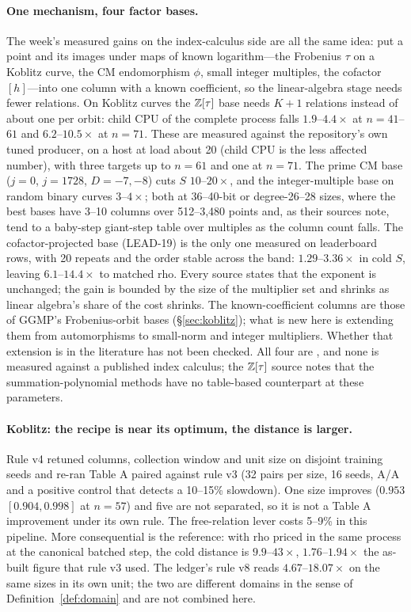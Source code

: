 \paragraph{One mechanism, four factor bases.} The week's measured gains on
the index-calculus side are all the same idea: put a point and its images
under maps of known logarithm---the Frobenius $\tau$ on a Koblitz curve, the
CM endomorphism $\phi$, small integer multiples, the cofactor $[h]$---into
one column with a known coefficient, so the linear-algebra stage needs fewer
relations. On Koblitz curves the $\mathbb{Z}[\tau]$ base needs $K+1$ relations
instead of about one per orbit: child CPU of the complete process falls
$1.9$--$4.4\times$ at $n=41$--$61$ and $6.2$--$10.5\times$ at $n=71$. These
are measured against the repository's own tuned producer, on a host at load
about 20 (child CPU is the less affected number), with three targets up to
$n=61$ and one at $n=71$. The prime CM base ($j=0$, $j=1728$, $D=-7,-8$) cuts
$S$ $10$--$20\times$, and the integer-multiple base on random binary curves
$3$--$4\times$; both at 36--40-bit or degree-26--28 sizes, where the best
bases have 3--10 columns over 512--3{,}480 points and, as their sources note,
tend to a baby-step giant-step table over multiples as the column count
falls. The
cofactor-projected base (LEAD-19) is the only one measured on leaderboard
rows, with 20 repeats and the order stable across the band: $1.29$--$3.36\times$
in cold $S$, leaving $6.1$--$14.4\times$ to matched rho. Every source states
that the exponent is unchanged; the gain is bounded by the size of the
multiplier set and shrinks as linear algebra's share of the cost shrinks.
The known-coefficient columns are those of GGMP's Frobenius-orbit bases
\cite{ggmp2020} (\S\ref{sec:koblitz}); what is new here is extending them
from automorphisms to small-norm and integer multipliers. Whether that
extension is in the literature has not been checked. All four are
, and none is measured against a published index
calculus; the $\mathbb{Z}[\tau]$ source notes that the summation-polynomial methods
have no table-based counterpart at these parameters.

\paragraph{Koblitz: the recipe is near its optimum, the distance is
larger.} Rule v4 retuned columns, collection window and unit size on
disjoint training seeds and re-ran Table A paired against rule v3 (32 pairs
per size, 16 seeds, A/A and a positive control that detects a 10--15\%
slowdown). One size improves ($0.953$ $[0.904,0.998]$ at $n=57$) and five are
not separated, so it is not a Table A improvement under its own rule. The
free-relation lever costs 5--9\% in this pipeline. More consequential is the
reference: with rho priced in the same process at the canonical batched step,
the cold distance is $9.9$--$43\times$, $1.76$--$1.94\times$ the as-built
figure that rule v3 used. The ledger's rule v8 reads $4.67$--$18.07\times$ on
the same sizes in its own unit; the two are different domains in the sense of
Definition~\ref{def:domain} and are not combined here.

